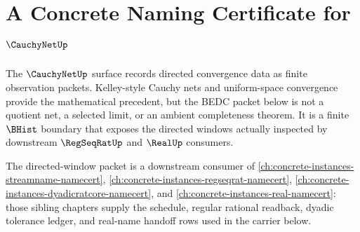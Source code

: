 \chapter{A Concrete Naming Certificate for $\CauchyNetUp$}
\label{ch:concrete-instances-cauchynet-namecert}

The $\CauchyNetUp$ surface records directed convergence data as finite observation packets. Kelley-style Cauchy nets and uniform-space convergence provide the mathematical precedent, but the BEDC packet below is not a quotient net, a selected limit, or an ambient completeness theorem. It is a finite $\BHist$ boundary that exposes the directed windows actually inspected by downstream $\RegSeqRatUp$ and $\RealUp$ consumers.

The directed-window packet is a downstream consumer of \autoref{ch:concrete-instances-streamname-namecert}, \autoref{ch:concrete-instances-regseqrat-namecert}, \autoref{ch:concrete-instances-dyadicratcore-namecert}, and \autoref{ch:concrete-instances-real-namecert}: those sibling chapters supply the schedule, regular rational readback, dyadic tolerance ledger, and real-name handoff rows used in the carrier below.

